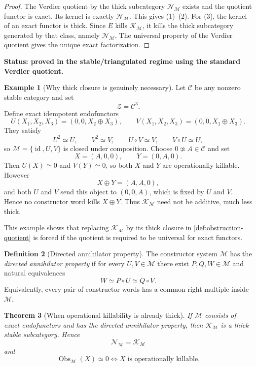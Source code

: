 \documentclass[11pt]{article}
\newtheorem{theorem}{Theorem}[section]
\theoremstyle{definition}
\newtheorem{definition}[theorem]{Definition}
\newtheorem{example}[theorem]{Example}
\theoremstyle{remark}
\newcommand{\Obs}{\operatorname{Obs}}
\newcommand{\id}{\operatorname{id}}
\newcommand{\status}[1]{\textbf{Status: #1.}}
\begin{document}
\begin{proof}
The Verdier quotient by the thick subcategory $\mathcal N_{\mathscr M}$ exists and the quotient functor is exact. Its kernel is exactly $\mathcal N_{\mathscr M}$. This gives (1)--(2). For (3), the kernel of an exact functor is thick. Since $E$ kills $\mathcal K_{\mathscr M}$, it kills the thick subcategory generated by that class, namely $\mathcal N_{\mathscr M}$. The universal property of the Verdier quotient gives the unique exact factorization.
\end{proof}

\status{proved in the stable/triangulated regime using the standard Verdier quotient}

\begin{example}[Why thick closure is genuinely necessary]\label{ex:killable-not-thick}
Let $\mathcal C$ be any nonzero stable category and set
\[
\mathcal Z=\mathcal C^3.
\]
Define exact idempotent endofunctors
\[
U(X_1,X_2,X_3)=(0,0,X_2\oplus X_3),
\qquad
V(X_1,X_2,X_3)=(0,0,X_1\oplus X_3).
\]
They satisfy
\[
U^2\simeq U,
\qquad
V^2\simeq V,
\qquad
U\circ V\simeq V,
\qquad
V\circ U\simeq U,
\]
so $\mathscr M=\{\id,U,V\}$ is closed under composition. Choose $0\not\simeq A\in\mathcal C$ and set
\[
X=(A,0,0),
\qquad
Y=(0,A,0).
\]
Then $U(X)\simeq0$ and $V(Y)\simeq0$, so both $X$ and $Y$ are operationally killable. However
\[
X\oplus Y=(A,A,0),
\]
and both $U$ and $V$ send this object to $(0,0,A)$, which is fixed by $U$ and $V$. Hence no constructor word kills $X\oplus Y$. Thus $\mathcal K_{\mathscr M}$ need not be additive, much less thick.
\end{example}

This example shows that replacing $\mathcal K_{\mathscr M}$ by its thick closure in \cref{def:obstruction-quotient} is forced if the quotient is required to be universal for exact functors.

\begin{definition}[Directed annihilator property]
The constructor system $\mathscr M$ has the \emph{directed annihilator property} if for every $U,V\in\mathscr M$ there exist $P,Q,W\in\mathscr M$ and natural equivalences
\[
W\simeq P\circ U\simeq Q\circ V.
\]
Equivalently, every pair of constructor words has a common right multiple inside $\mathscr M$.
\end{definition}

\begin{theorem}[When operational killability is already thick]\label{thm:killable-thick}
If $\mathscr M$ consists of exact endofunctors and has the directed annihilator property, then $\mathcal K_{\mathscr M}$ is a thick stable subcategory. Hence
\[
\mathcal N_{\mathscr M}=\mathcal K_{\mathscr M}
\]
and
\[
\boxed{
\Obs_{\mathscr M}(X)\simeq0
\iff
X\text{ is operationally killable}.}
\]
\end{theorem}
\end{document}
